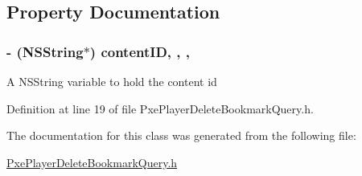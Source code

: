 \subsection{Property Documentation}
\hypertarget{interface_pxe_player_delete_bookmark_query_a135e067fd8555137353f7422b95eaabb}{
\subsubsection[{content\-I\-D}]{\setlength{\rightskip}{0pt plus 5cm}-\/ (N\-S\-String$\ast$) content\-I\-D\hspace{0.3cm}{\ttfamily [read]}, {\ttfamily [write]}, {\ttfamily [nonatomic]}, {\ttfamily [strong]}}}\label{interface_pxe_player_delete_bookmark_query_a135e067fd8555137353f7422b95eaabb}
A N\-S\-String variable to hold the content id 

Definition at line 19 of file Pxe\-Player\-Delete\-Bookmark\-Query.\-h.



The documentation for this class was generated from the following file\-:\begin{DoxyCompactItemize}
\item 
\hyperlink{_pxe_player_delete_bookmark_query_8h}{Pxe\-Player\-Delete\-Bookmark\-Query.\-h}\end{DoxyCompactItemize}
